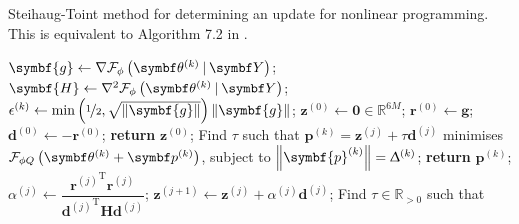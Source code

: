 \begin{algorithm}
    \caption[
        Steihaug-Toint method for determining an update for nonlinear
        programming.
    ]{
        Steihaug-Toint method for determining an update for nonlinear
        programming. This is equivalent to Algorithm 7.2 in \cite{Nocedal2006}.
    }
    \label{alg:steihaug-toint}
    \begin{algorithmic}[1]
            \State $\symbf{g} \gets \nabla \FphithkY$;
            \State $\symbf{H} \gets \nabla^2 \FphithkY$;
            \State $\epsilon^{(k)} \gets \min\left(
                    \nicefrac{1}{2},
                    \sqrt{\left\lVert \symbf{g} \right\rVert}
                \right)
                \left\lVert \symbf{g} \right\rVert
                $;
            \State $\symbf{z}^{(0)} \gets \symbf{0} \in \mathbb{R}^{6M}$;
            \State $\symbf{r}^{(0)} \gets \symbf{g}$;
            \State $\symbf{d}^{(0)} \gets -\symbf{r}^{(0)}$;
                \State \textbf{return} $\symbf{z}^{(0)}$;
            \EndIf
                \State Find $\tau$ such that $\symbf{p}^{(k)} = \symbf{z}^{(j)} + \tau \symbf{d}^{(j)}$
                    minimises $\FphiQthkpk$, subject to
                    $\left \lVert \symbf{p}^{(k)} \right \rVert = \trustradius{k}$;
                    \State \textbf{return} $\symbf{p}^{(k)}$;
                \EndIf
                \State $\alpha^{(j)} \gets \dfrac
                    {{\symbf{r}^{(j)}}^{\mathrm{T}} \symbf{r}^{(j)}}
                    {
                        {\symbf{d}^{(j)}}^{\mathrm{T}}
                        \symbf{H}
                        \symbf{d}^{(j)}
                    }$;
                \State $\symbf{z}^{(j+1)} \gets \symbf{z}^{(j)} + \alpha^{(j)} \symbf{d}^{(j)}$;
                    \State Find $\tau \in \mathbb{R}_{>0}$ such that

\end{algorithmic}
\end{algorithm}
